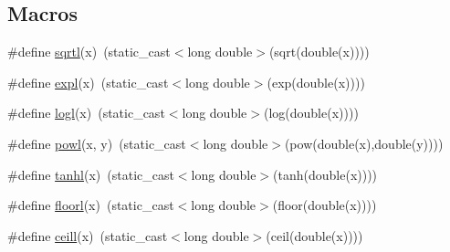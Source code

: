 \subsection*{Macros}
\begin{DoxyCompactItemize}
\item 
\#define \hyperlink{centroidalifold_2contralign_2_utilities_8ipp_adec5708ea4f27b718663e2a57e73303a}{sqrtl}(x)~(static\+\_\+cast$<$long double$>$(sqrt(double(x))))
\item 
\#define \hyperlink{centroidalifold_2contralign_2_utilities_8ipp_a3262d247d0e746116959ee487aed42e1}{expl}(x)~(static\+\_\+cast$<$long double$>$(exp(double(x))))
\item 
\#define \hyperlink{centroidalifold_2contralign_2_utilities_8ipp_af30ed28c10eaaab05f92d1043d458741}{logl}(x)~(static\+\_\+cast$<$long double$>$(log(double(x))))
\item 
\#define \hyperlink{centroidalifold_2contralign_2_utilities_8ipp_a38ce40625edb986ea847a15a34615cc1}{powl}(x, y)~(static\+\_\+cast$<$long double$>$(pow(double(x),double(y))))
\item 
\#define \hyperlink{centroidalifold_2contralign_2_utilities_8ipp_a99028516a5b84b8232290731299c72cd}{tanhl}(x)~(static\+\_\+cast$<$long double$>$(tanh(double(x))))
\item 
\#define \hyperlink{centroidalifold_2contralign_2_utilities_8ipp_a0ea134b0841e1599acca1a6798ef4607}{floorl}(x)~(static\+\_\+cast$<$long double$>$(floor(double(x))))
\item 
\#define \hyperlink{centroidalifold_2contralign_2_utilities_8ipp_a8bd1d8e6a787be7c41651531bb76e2f8}{ceill}(x)~(static\+\_\+cast$<$long double$>$(ceil(double(x))))
\end{DoxyCompactItemize}
